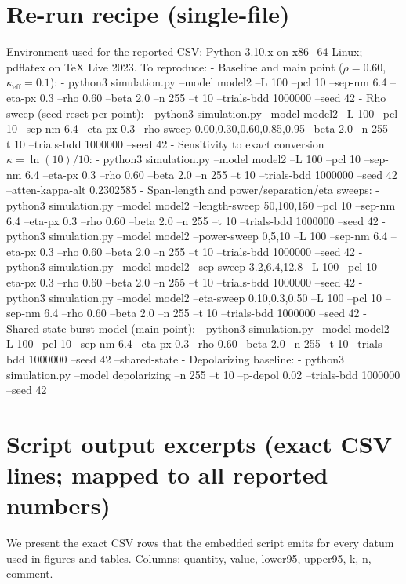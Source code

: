 \documentclass[conference]{IEEEtran}
\newcommand{\simL}{100}
\newcommand{\simpcl}{10}
\newcommand{\simsep}{6.4}
\newcommand{\simeta}{0.3}
\newcommand{\simn}{255}
\newcommand{\simt}{10}
\newcommand{\simtrials}{1000000}
\newcommand{\simseed}{42}
\newcommand{\simrhoB}{0.60}
\newcommand{\simrhoD}{0.00}
\newcommand{\simrhoA}{0.30}
\newcommand{\simrhoC}{0.85}
\newcommand{\simrhoE}{0.95}
\newcommand{\simkappaExact}{0.2302585}
\newcommand{\simLfa}{50}
\newcommand{\simLfb}{150}
\newcommand{\simpclA}{0}
\newcommand{\simpclB}{5}
\newcommand{\simpclC}{10}
\newcommand{\simsepA}{3.2}
\newcommand{\simsepB}{12.8}
\newcommand{\simetaA}{0.10}
\newcommand{\simetaB}{0.50}
\newcommand{\simDepolP}{0.02}
\begin{document}
\section*{Re-run recipe (single-file)}
Environment used for the reported CSV: Python 3.10.x on x86\_64 Linux; pdflatex on TeX Live 2023. To reproduce:
- Baseline and main point (\(\rho=\simrhoB\), \(\kappa_{\mathrm{eff}}=0.1\)):
  - python3 simulation.py --model model2 --L \simL{} --pcl \simpcl{} --sep-nm \simsep{} --eta-px \simeta{} --rho \simrhoB{} --beta 2.0 --n \simn{} --t \simt{} --trials-bdd \simtrials{} --seed \simseed
- Rho sweep (seed reset per point):
  - python3 simulation.py --model model2 --L \simL{} --pcl \simpcl{} --sep-nm \simsep{} --eta-px \simeta{} --rho-sweep \simrhoD{},\simrhoA{},\simrhoB{},\simrhoC{},\simrhoE{} --beta 2.0 --n \simn{} --t \simt{} --trials-bdd \simtrials{} --seed \simseed
- Sensitivity to exact conversion \(\kappa=\ln(10)/10\):
  - python3 simulation.py --model model2 --L \simL{} --pcl \simpcl{} --sep-nm \simsep{} --eta-px \simeta{} --rho \simrhoB{} --beta 2.0 --n \simn{} --t \simt{} --trials-bdd \simtrials{} --seed \simseed{} --atten-kappa-alt \simkappaExact
- Span-length and power/separation/eta sweeps:
  - python3 simulation.py --model model2 --length-sweep \simLfa{},\simL{},\simLfb{} --pcl \simpcl{} --sep-nm \simsep{} --eta-px \simeta{} --rho \simrhoB{} --beta 2.0 --n \simn{} --t \simt{} --trials-bdd \simtrials{} --seed \simseed
  - python3 simulation.py --model model2 --power-sweep \simpclA{},\simpclB{},\simpclC{} --L \simL{} --sep-nm \simsep{} --eta-px \simeta{} --rho \simrhoB{} --beta 2.0 --n \simn{} --t \simt{} --trials-bdd \simtrials{} --seed \simseed
  - python3 simulation.py --model model2 --sep-sweep \simsepA{},\simsep{},\simsepB{} --L \simL{} --pcl \simpcl{} --eta-px \simeta{} --rho \simrhoB{} --beta 2.0 --n \simn{} --t \simt{} --trials-bdd \simtrials{} --seed \simseed
  - python3 simulation.py --model model2 --eta-sweep \simetaA{},\simeta{},\simetaB{} --L \simL{} --pcl \simpcl{} --sep-nm \simsep{} --rho \simrhoB{} --beta 2.0 --n \simn{} --t \simt{} --trials-bdd \simtrials{} --seed \simseed
- Shared-state burst model (main point):
  - python3 simulation.py --model model2 --L \simL{} --pcl \simpcl{} --sep-nm \simsep{} --eta-px \simeta{} --rho \simrhoB{} --beta 2.0 --n \simn{} --t \simt{} --trials-bdd \simtrials{} --seed \simseed{} --shared-state
- Depolarizing baseline:
  - python3 simulation.py --model depolarizing --n \simn{} --t \simt{} --p-depol \simDepolP{} --trials-bdd \simtrials{} --seed \simseed

\section*{Script output excerpts (exact CSV lines; mapped to all reported numbers)}
We present the exact CSV rows that the embedded script emits for every datum used in figures and tables. Columns: quantity, value, lower95, upper95, k, n, comment.
\end{document}

